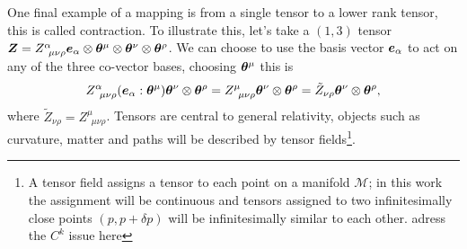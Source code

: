 One final example of a mapping is from a single tensor to a lower rank tensor, this is called contraction. To illustrate this, let's take a $(1,3)$ tensor $\boldsymbol{Z} = Z^\alpha_{\,\,\,\mu\nu\rho} \boldsymbol{e}_\alpha \otimes\boldsymbol{\theta}^\mu\otimes\boldsymbol{\theta}^\nu\otimes\boldsymbol{\theta}^\rho$. We can choose to use the basis vector $\boldsymbol{e}_\alpha$ to act on any of the three co-vector bases, choosing $\boldsymbol{\theta}^\mu$ this is
\begin{equation}
Z^\alpha_{\,\,\,\mu\nu\rho} (\boldsymbol{e}_\alpha : \boldsymbol{\theta}^\mu)\boldsymbol{\theta}^\nu\otimes\boldsymbol{\theta}^\rho = Z^\mu_{\,\,\,\mu\nu\rho}\boldsymbol{\theta}^\nu\otimes\boldsymbol{\theta}^\rho = \tilde{Z}_{\nu\rho}\boldsymbol{\theta}^\nu\otimes\boldsymbol{\theta}^\rho,
\end{equation} 
where $\tilde{Z}_{\nu\rho} = Z^\mu_{\,\,\,\mu\nu\rho}$. Tensors are central to general relativity, objects such as curvature, matter and paths will be described by tensor fields\footnote{A tensor field assigns a tensor to each point on a manifold $\mathcal{M}$; in this work the assignment will be continuous and tensors assigned to two infinitesimally close points $(p,p+\delta p)$ will be infinitesimally similar to each other. \color{gren} adress the $C^k$ issue here}. 






